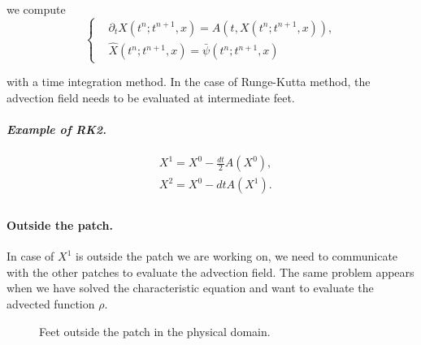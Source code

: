 \documentclass[presentation.tex]{subfiles}
\begin{document}
we compute 
\begin{equation}
\left\{
\begin{aligned}
	& \partial_t X(t^{n}; t^{n+1}, x)  = A(t, X(t^{n}; t^{n+1}, x)), \\
	& \hat{X}(t^{n}; t^{n+1}, x) = \bar{\psi} (t^{n}; t^{n+1}, x)
\end{aligned}
\right.
\end{equation}

with a time integration method. In the case of Runge-Kutta method, the advection field needs to be evaluated at intermediate feet.

\paragraph{\textit{Example of RK2.}}
\begin{equation}
\begin{aligned}
	& X^1 = X^0 - \frac{dt}{2} A(X^0), \\
	& X^2 = X^0 - dt A(X^1). \\
\end{aligned}
\end{equation}


\paragraph{Outside the patch.}
In case of $X^1$ is outside the patch we are working on, we need to communicate with the other patches to evaluate the advection field. 
The same problem appears when we have solved the characteristic equation and want to evaluate the advected function $\rho$. 


\begin{figure}[!h]
\centering
{}
\caption{Feet outside the patch in the physical domain.}
\end{figure}
\end{document}
